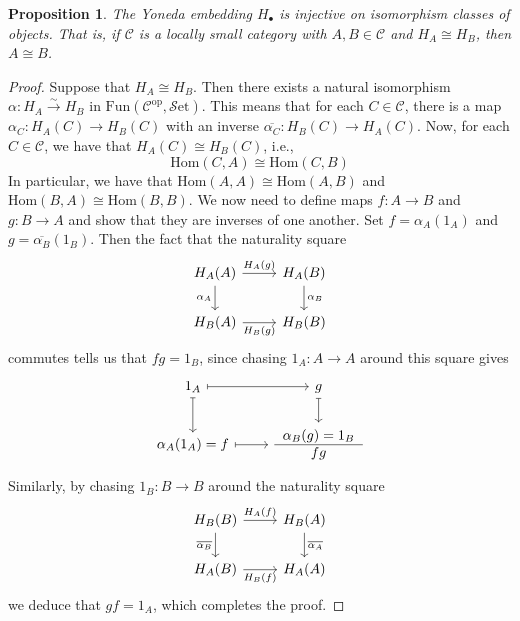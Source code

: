 \documentclass[10pt,oneside]{book}
\def\~#1{\mathscr{#1}}
\newcommand{\op}{\mathrm{op}}
\newcommand{\Hom}{\mathrm{Hom}}
\newcommand{\isom}{\xrightarrow{\sim}}
\newcommand{\Fun}{\mathrm{Fun}}
\newcommand{\Set}{\~S\mathrm{et}}
\theoremstyle{plain}
\newtheorem{prop}[thm]{Proposition}
\theoremstyle{definition}
\theoremstyle{remark}
\numberwithin{equation}{section}
\numberwithin{figure}{section}
\begin{document}
\begin{prop}
    The Yoneda embedding $H_\bullet$ is injective on isomorphism classes of objects. That is, if $\~C$ is a locally small category with $A, B \in \~C$ and $H_A \cong H_{B}$, then $A \cong B$.
\end{prop}

\begin{proof}
    Suppose that $H_A \cong H_{B}$. Then there exists a natural isomorphism $\alpha: H_A \isom H_{B}$ in $\Fun(\~C^\op, \Set)$. This means that for each $C \in \~C$, there is a map $\alpha_C: H_A(C) \to H_{B}(C)$ with an inverse $\overline{\alpha_C}: H_{B}(C) \to H_A(C)$. Now, for each $C \in \~C$, we have that $H_A(C) \cong H_{B}(C)$, i.e.,
    \[\Hom(C, A) \cong \Hom(C, B)\]
    In particular, we have that $\Hom(A, A) \cong \Hom(A, B)$ and $\Hom(B, A) \cong \Hom(B, B)$. We now need to define maps $f: A \to B$ and $g: B \to A$ and show that they are inverses of one another. Set $f = \alpha_A(1_A)$ and $g = \overline{\alpha_B}(1_B)$. Then the fact that the naturality square
    \[\begin{tikzcd}
    {H_A(A)} & {H_A(B)} \\
    {H_{B}(A)} & {H_{B}(B)}
    \arrow["{H_A(g)}", from=1-1, to=1-2]
    \arrow["{\alpha_A}"', from=1-1, to=2-1]
    \arrow["{\alpha_{B}}", from=1-2, to=2-2]
    \arrow["{H_{B}(g)}"', from=2-1, to=2-2]
\end{tikzcd}\]
commutes tells us that $fg = 1_{B}$, since chasing $1_A: A \to A$ around this square gives
\[\begin{tikzcd}
    {1_A} & g \\
    {\alpha_A(1_A) = f} & {\begin{tabular}{c} $\alpha_{B}(g) = 1_{B}$ \\ \hline $fg$ \end{tabular}}
    \arrow[maps to, from=1-1, to=1-2]
    \arrow[maps to, from=1-1, to=2-1]
    \arrow[maps to, from=1-2, to=2-2]
    \arrow[maps to, from=2-1, to=2-2]
\end{tikzcd}\]
Similarly, by chasing $1_B: B \to B$ around the naturality square
\[\begin{tikzcd}
    {H_B(B)} & {H_B(A)} \\
    {H_A(B)} & {H_A(A)}
    \arrow["{H_A(f)}", from=1-1, to=1-2]
    \arrow["{\overline{\alpha_B}}"', from=1-1, to=2-1]
    \arrow["{\overline{\alpha_A}}", from=1-2, to=2-2]
    \arrow["{H_B(f)}"', from=2-1, to=2-2]
\end{tikzcd}\]
we deduce that $gf = 1_A$, which completes the proof.
\end{proof}
\end{document}
